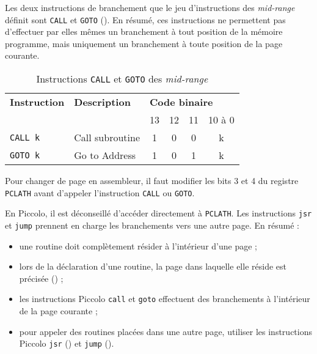 Les deux instructions de branchement que le jeu d'instructions des \emph{mid-range} définit sont \texttt{CALL} et \texttt{GOTO} (). En résumé, ces instructions ne permettent pas d'effectuer par elles mêmes un branchement à tout position de la mémoire programme, mais uniquement un branchement à toute position de la page courante.

\begin{table}[!ht]
  \centering
  \small
  \begin{tabular}{llcccc}
    \textbf{Instruction} & \textbf{Description} & \multicolumn{4}{l}{\bf Code binaire}\\
                         &                      & 13 & 12 & 11 & 10 à 0\\
    \hline
    \texttt{CALL k}  & Call subroutine & 1 & 0 & 0 & k \\
    \texttt{GOTO k}  & Go to Address   & 1 & 0 & 1 & k \\
    \hline
  \end{tabular}
  \caption{Instructions \texttt{CALL} et \texttt{GOTO} des \emph{mid-range}}
\end{table}



Pour changer de page en assembleur, il faut modifier les bits 3 et 4 du registre \texttt{PCLATH} avant d'appeler l'instruction \texttt{CALL} ou \texttt{GOTO}.

En Piccolo, il est déconseillé d'accéder directement à \texttt{PCLATH}. Les instructions \texttt{jsr} et \texttt{jump} prennent en charge les branchements vers une autre page. En résumé :
\begin{itemize}
  \item une routine doit complètement résider à l'intérieur d'une page ;
  \item lors de la déclaration d'une routine, la page dans laquelle elle réside est précisée () ;
  \item les instructions Piccolo \texttt{call} et \texttt{goto} effectuent des branchements à l'intérieur de la page courante ;
  \item pour appeler des routines placées dans une autre page, utiliser les instructions Piccolo \texttt{jsr} () et \texttt{jump} ().
\end{itemize}



